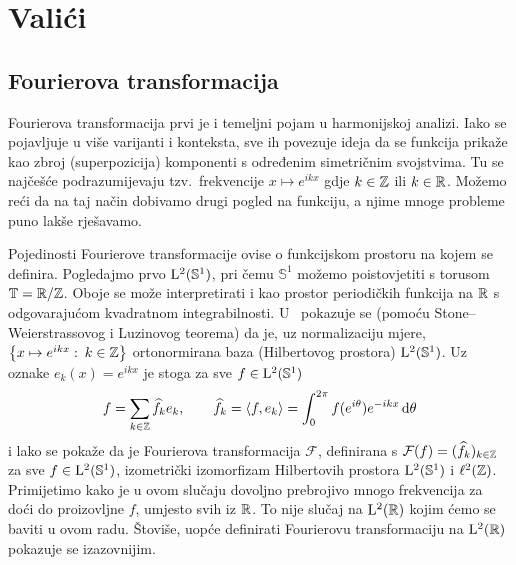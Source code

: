 \documentclass[main.tex]{subfiles}
\begin{document}
\nocite{*}

\chapter{Valići}\label{ch-ha}
\section{Fourierova transformacija}\label{sec:ha-four}
Fourierova transformacija prvi je i temeljni pojam u harmonijskoj analizi.
Iako se pojavljuje u više varijanti i konteksta, sve ih povezuje
ideja da se funkcija prikaže kao zbroj (superpozicija) komponenti s određenim simetričnim svojstvima.
Tu se najčešće podrazumijevaju tzv.\ frekvencije
\( x \mapsto e^{ikx} \) gdje \( k \in \mathbb{Z} \) ili \( k \in \mathbb{R} \).
Možemo reći da na taj način dobivamo drugi pogled na funkciju, a njime
mnoge probleme puno lakše rješavamo.

Pojedinosti Fourierove transformacije ovise o funkcijskom prostoru
na kojem se definira. Pogledajmo prvo \( \mathrm{L}^2(\mathbb S^1) \),
pri čemu \( \mathbb S^1 \) možemo poistovjetiti
s torusom \( \mathbb T = \mathbb{R}/\mathbb{Z} \). Oboje se može interpretirati
i kao prostor periodičkih funkcija na \( \mathbb{R} \) s odgovarajućom kvadratnom integrabilnosti.
U~\cite[]{gogic} pokazuje se (pomoću Stone--Weierstrassovog i Luzinovog teorema) da je, uz normalizaciju mjere,
\( \left\{ x \mapsto e^{ikx} \, \colon \, k \in \mathbb{Z} \right\} \)
ortonormirana baza (Hilbertovog prostora) \( \mathrm{L}^2(\mathbb S^1) \).
Uz oznake \( e_k(x) = e^{ikx} \) je stoga za sve \( f \in \mathrm{L}^2(\mathbb S^1) \)
\begin{equation}
	f = \sum_{k \in \mathbb{Z}} \widehat{f}_k e_k,
	\qquad \widehat{f}_k = \left\langle {f}, {e_k} \right\rangle = \int_0^{2\pi} f(e^{i\theta}) e^{-ikx} \,\mathrm d \theta
\end{equation}
i lako se pokaže da je Fourierova transformacija \( \mathcal F \),
definirana s \( \mathcal F(f) = (\widehat{f}_k)_{k \in \mathbb{Z}} \) za sve \( f \in \mathrm{L}^2(\mathbb S^1) \), izometrički izomorfizam
Hilbertovih prostora \( \mathrm{L}^2(\mathbb S^1) \) i \( \ell^2(\mathbb{Z}) \).
Primijetimo kako je u ovom slučaju dovoljno prebrojivo mnogo frekvencija za doći do
proizovljne \( f \), umjesto svih iz \( \mathbb{R} \). To nije slučaj na \( \mathrm{L}^2(\mathbb{R}) \) kojim ćemo se baviti u ovom radu.
Štoviše, uopće definirati Fourierovu transformaciju na \( \mathrm{L}^2(\mathbb{R}) \) pokazuje se izazovnijim.
\end{document}
